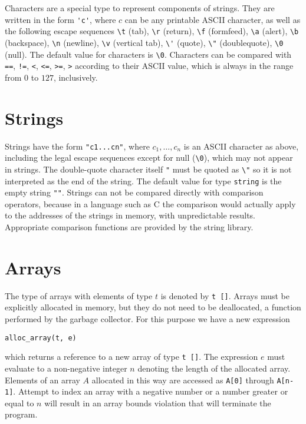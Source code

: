 \documentclass[11pt]{article}
\begin{document}
Characters are a special type to represent components of strings.
They are written in the form \verb!'c'!, where $c$ can be any printable
ASCII character, as well as the following escape sequences \verb'\t'
(tab), \verb'\r' (return), \verb'\f' (formfeed), \verb'\a' (alert),
\verb'\b' (backspace), \verb'\n' (newline), \verb'\v' (vertical tab),
\verb!\'! (quote), \verb'\"' (doublequote), \verb'\0' (null).  The
default value for characters is \verb'\0'.  Characters can be compared
with \verb'==', \verb'!=', \verb'<', \verb'<=', \verb'>=', \verb'>'
according to their ASCII value, which is always in the range from $0$
to $127$, inclusively.

\section{Strings}

Strings have the form \verb'"c1...cn"', where $c_1, \ldots, c_n$ is an
ASCII character as above, including the legal escape sequences except
for null (\verb'\0'), which may not appear in strings.  The
double-quote character itself \verb'"' must be quoted as \verb'\"' so
it is not interpreted as the end of the string.  The default value for
type \verb'string' is the empty string \verb'""'.  Strings can not be
compared directly with comparison operators, because in a language
such as C the comparison would actually apply to the addresses of the
strings in memory, with unpredictable results.  Appropriate comparison
functions are provided by the string library.

\section{Arrays}

The type of arrays with elements of type $t$ is denoted
by \verb't []'.  Arrays must be explicitly allocated in memory,
but they do not need to be deallocated, a function performed by
the garbage collector.  For this purpose we have a new expression
\begin{verbatim}
alloc_array(t, e)
\end{verbatim}
which returns a reference to a new array of type \verb't []'.  The
expression $e$ must evaluate to a non-negative integer $n$
denoting the length of the allocated array.  Elements
of an array $A$ allocated in this way are accessed as
\verb'A[0]' through \verb'A[n-1]'.  Attempt to index an array
with a negative number or a number greater or equal to $n$ will
result in an array bounds violation that will terminate the
program.
\end{document}
